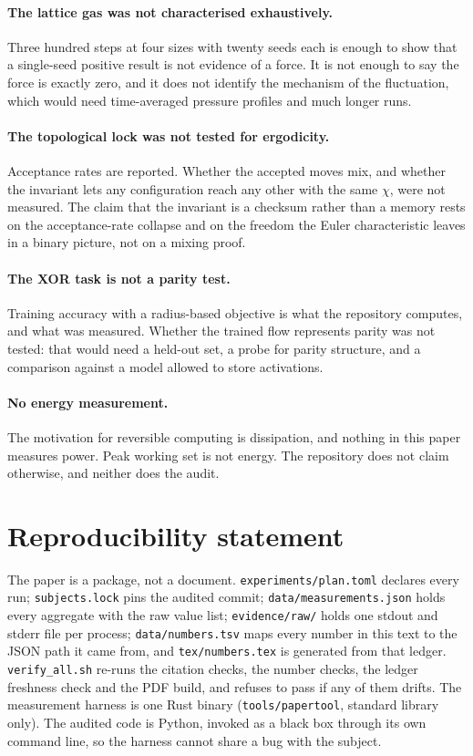 \documentclass[11pt,a4paper]{article}
\begin{document}
\paragraph{The lattice gas was not characterised exhaustively.} Three hundred steps at four sizes
with twenty seeds each is enough to show that a single-seed positive result is not evidence of a
force. It is not enough to say the force is exactly zero, and it does not identify the mechanism
of the fluctuation, which would need time-averaged pressure profiles and much longer runs.

\paragraph{The topological lock was not tested for ergodicity.} Acceptance rates are reported.
Whether the accepted moves mix, and whether the invariant lets any configuration reach any other
with the same $\chi$, were not measured. The claim that the invariant is a checksum rather than a
memory rests on the acceptance-rate collapse and on the freedom the Euler characteristic leaves in
a binary picture, not on a mixing proof.

\paragraph{The XOR task is not a parity test.} Training accuracy with a radius-based objective is
what the repository computes, and what was measured. Whether the trained flow represents parity
was not tested: that would need a held-out set, a probe for parity structure, and a comparison
against a model allowed to store activations.

\paragraph{No energy measurement.} The motivation for reversible computing is dissipation, and
nothing in this paper measures power. Peak working set is not energy. The repository does not
claim otherwise, and neither does the audit.

\section{Reproducibility statement}

The paper is a package, not a document. \texttt{experiments/plan.toml} declares every run;
\texttt{subjects.lock} pins the audited commit; \texttt{data/measurements.json} holds every
aggregate with the raw value list; \texttt{evidence/raw/} holds one stdout and stderr file per
process; \texttt{data/numbers.tsv} maps every number in this text to the JSON path it came from,
and \texttt{tex/numbers.tex} is generated from that ledger. \texttt{verify\_all.sh} re-runs the
citation checks, the number checks, the ledger freshness check and the PDF build, and refuses to
pass if any of them drifts. The measurement harness is one Rust binary (\texttt{tools/papertool},
standard library only). The audited code is Python, invoked as a black box through its own
command line, so the harness cannot share a bug with the subject.
\end{document}
